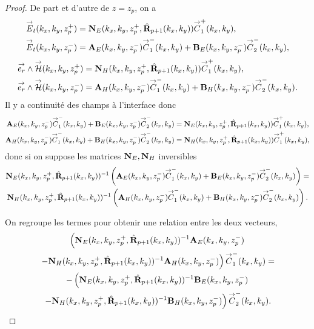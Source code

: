     \begin{proof}
      De part et d'autre de \(z=z_p\), on a 
      \begin{align*}
        {\overset{\rightarrow}{E}}_t(k_x,k_y,z_p^+) &= \mathbf{N}_{E}(k_x,k_y,z_p^+,\hat{\mathbf{R}}_{p+1}(k_x,k_y)){\overset{\rightarrow}{C}}_{1}^+(k_x,k_y),
        \\
        {\overset{\rightarrow}{E}}_t(k_x,k_y,z_p^-) &= \mathbf{A}_E(k_x,k_y,z_p^-){\overset{\rightarrow}{C}}_{1}^-(k_x,k_y) + \mathbf{B}_E(k_x,k_y,z_p^-){\overset{\rightarrow}{C}}_{2}^-(k_x,k_y),
      \end{align*}
      \begin{align*}
        {\overset{\rightarrow}{e_r}}\wedge{\overset{\rightarrow}{\mathcal{H}}}(k_x,k_y,z_p^+) &= \mathbf{N}_{H}(k_x,k_y,z_p^+,\hat{\mathbf{R}}_{p+1}(k_x,k_y)){\overset{\rightarrow}{C}}_{1}^+(k_x,k_y),
        \\
        {\overset{\rightarrow}{e_r}}\wedge{\overset{\rightarrow}{\mathcal{H}}}(k_x,k_y,z_p^-) &= \mathbf{A}_H(k_x,k_y,z_p^-){\overset{\rightarrow}{C}}_{1}^-(k_x,k_y) + \mathbf{B}_H(k_x,k_y,z_p^-){\overset{\rightarrow}{C}}_{2}^-(k_x,k_y).
      \end{align*}
      Il y a continuité des champs à l'interface donc
      \begin{align*}
        \mathbf{A}_E(k_x,k_y,z_p^-){\overset{\rightarrow}{C}}_{1}^-(k_x,k_y) + \mathbf{B}_E(k_x,k_y,z_p^-){\overset{\rightarrow}{C}}_{2}^-(k_x,k_y) &= \mathbf{N}_{E}(k_x,k_y,z_p^+,\hat{\mathbf{R}}_{p+1}(k_x,k_y)){\overset{\rightarrow}{C}}_{1}^+(k_x,k_y),
        \\
        \mathbf{A}_H(k_x,k_y,z_p^-){\overset{\rightarrow}{C}}_{1}^-(k_x,k_y) + \mathbf{B}_H(k_x,k_y,z_p^-){\overset{\rightarrow}{C}}_{2}^-(k_x,k_y) &= \mathbf{N}_{H}(k_x,k_y,z_p^+,\hat{\mathbf{R}}_{p+1}(k_x,k_y)){\overset{\rightarrow}{C}}_{1}^+(k_x,k_y),
      \end{align*}
      donc si on suppose les matrices \(\mathbf{N}_E, \mathbf{N}_H\) inversibles
      \begin{multline*}
        \mathbf{N}_{E}(k_x,k_y,z_p^+,\hat{\mathbf{R}}_{p+1}(k_x,k_y))^{-1}\left(\mathbf{A}_E(k_x,k_y,z_p^-){\overset{\rightarrow}{C}}_{1}^-(k_x,k_y) + \mathbf{B}_E(k_x,k_y,z_p^-){\overset{\rightarrow}{C}}_{2}^-(k_x,k_y)\right) =
        \\
        \mathbf{N}_{H}(k_x,k_y,z_p^+,\hat{\mathbf{R}}_{p+1}(k_x,k_y))^{-1}\left(\mathbf{A}_H(k_x,k_y,z_p^-){\overset{\rightarrow}{C}}_{1}^-(k_x,k_y) + \mathbf{B}_H(k_x,k_y,z_p^-){\overset{\rightarrow}{C}}_{2}^-(k_x,k_y)\right).
      \end{multline*}

      On regroupe les termes pour obtenir une relation entre les deux vecteurs,
      \begin{multline*}
        \left(
        \mathbf{N}_{E}(k_x,k_y,z_p^+,\hat{\mathbf{R}}_{p+1}(k_x,k_y))^{-1}\mathbf{A}_E(k_x,k_y,z_p^-)
        \right.
        \\
        \left.
        - \mathbf{N}_{H}(k_x,k_y,z_p^+,\hat{\mathbf{R}}_{p+1}(k_x,k_y))^{-1}\mathbf{A}_H(k_x,k_y,z_p^-)
        \right){\overset{\rightarrow}{C}}_{1}^-(k_x,k_y) =
        \\
        -\left(
        \mathbf{N}_{E}(k_x,k_y,z_p^+,\hat{\mathbf{R}}_{p+1}(k_x,k_y))^{-1}\mathbf{B}_E(k_x,k_y,z_p^-)
        \right.
        \\
        \left.
        - \mathbf{N}_{H}(k_x,k_y,z_p^+,\hat{\mathbf{R}}_{p+1}(k_x,k_y))^{-1}\mathbf{B}_H(k_x,k_y,z_p^-)
        \right){\overset{\rightarrow}{C}}_{2}^-(k_x,k_y).
      \end{multline*}


\end{proof}
